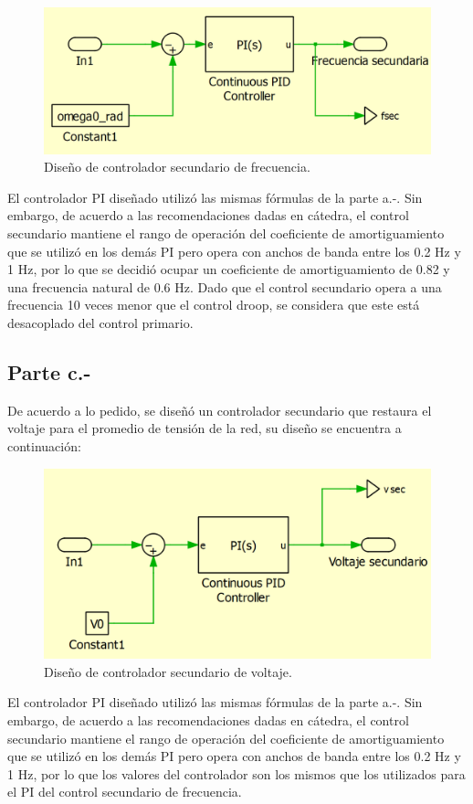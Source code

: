 \begin{figure}
   \centering
   \includegraphics[width=0.5\linewidth]{Tarea 1/report/imagenes/p3b/secundario frecuencia.png}
   \caption{Diseño de controlador secundario de frecuencia.}
   \label{diseñosecfrecuencia}
\end{figure}

El controlador PI diseñado utilizó las mismas fórmulas de la parte a.-. Sin embargo, de acuerdo a las recomendaciones dadas en cátedra, el control secundario mantiene el rango de operación del coeficiente de amortiguamiento que se utilizó en los demás PI pero opera con anchos de banda entre los 0.2 Hz y 1 Hz, por lo que se decidió ocupar un coeficiente de amortiguamiento de 0.82 y una frecuencia natural de 0.6 Hz. Dado que el control secundario opera a una frecuencia 10 veces menor que el control droop, se considera que este está desacoplado del control primario.

\subsection{Parte c.-}

De acuerdo a lo pedido, se diseñó un controlador secundario que restaura el voltaje para el promedio de tensión de la red, su diseño se encuentra a continuación:

\begin{figure}
   \centering
   \includegraphics[width=0.5\linewidth]{Tarea 1/report/imagenes/p3c/secundario voltaje.png}
   \caption{Diseño de controlador secundario de voltaje.}
   \label{diseñosecvoltaje}
\end{figure}

El controlador PI diseñado utilizó las mismas fórmulas de la parte a.-. Sin embargo, de acuerdo a las recomendaciones dadas en cátedra, el control secundario mantiene el rango de operación del coeficiente de amortiguamiento que se utilizó en los demás PI pero opera con anchos de banda entre los 0.2 Hz y 1 Hz, por lo que los valores del controlador son los mismos que los utilizados para el PI del control secundario de frecuencia.\\

